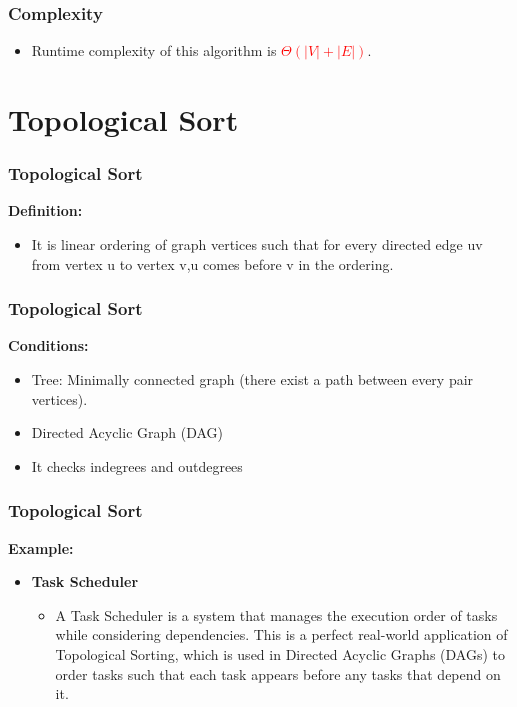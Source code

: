 \begin{frame}
    \frametitle{Complexity}
    \begin{itemize}
        \item Runtime complexity of this algorithm is \textbf{\textcolor{red}{\(\Theta(|V| + |E|)\)}}.
    \end{itemize}
\end{frame}


\section{\textbf{Topological Sort}}

\begin{frame}
    \frametitle{\textbf{Topological Sort}}
    \item\textbf{{Definition:}}
    \vspace{0.3cm}
        \begin{itemize}
            \item It is linear ordering of graph vertices such that for every directed edge uv from vertex u to vertex v,u comes before v in the ordering.
        \end{itemize}
\end{frame}


\begin{frame}
    \frametitle{\textbf{Topological Sort}}
    \item\textbf{{Conditions:}}
    \vspace{0.3cm}
        \begin{itemize}
            \item Tree: Minimally connected graph (there exist a path between every pair vertices).
            \item Directed Acyclic Graph (DAG)
            \item It checks indegrees and outdegrees
        \end{itemize}
\end{frame}

\begin{frame}
     \frametitle{\textbf{Topological Sort}}
     \item\textbf{{Example:}}
     \vspace{0.3cm}
        \begin{itemize}
             \item{\textbf{Task Scheduler}}
             \begin{itemize}
                    \item A Task Scheduler is a system that manages the execution order of tasks while considering dependencies. This is a perfect real-world application of Topological Sorting, which is used in Directed Acyclic Graphs (DAGs) to order tasks such that each task appears before any tasks that depend on it.
                \end{itemize}
        \end{itemize}
\end{frame}

